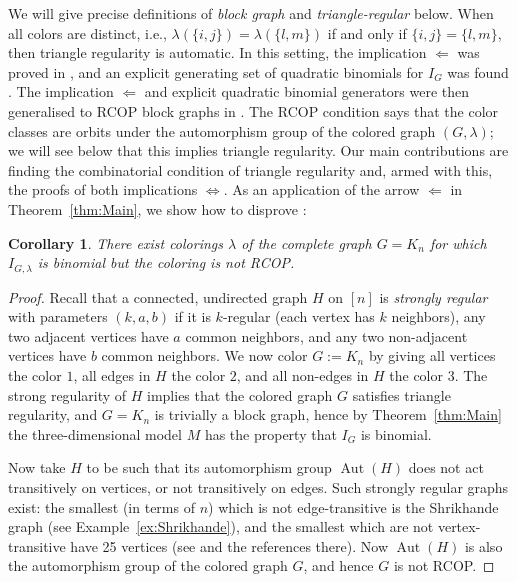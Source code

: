 \documentclass[a4paper, 11pt]{amsart}
\numberwithin{theorem}{section}
\newtheorem{corollary}[theorem]{Corollary}
\newcommand{\Aut}{\operatorname{Aut}}
\begin{document}
We will give precise definitions of {\em block graph} and {\em
triangle-regular} below. When all colors are distinct, i.e.,
$\lambda(\{i,j\})=\lambda(\{l,m\})$ if and only if $\{i,j\}=\{l,m\}$,
then triangle regularity is automatic. In this setting, the implication
$\Leftarrow$ was proved in \cite{MS21}, and an explicit generating
set of quadratic binomials for $I_G$ was found \cite[Theorem 5]{MS21}.
The implication $\Leftarrow$ and explicit quadratic binomial generators
were then generalised to RCOP block graphs in \cite{CMMPS23}. The RCOP
condition says that the color classes are orbits under the automorphism
group of the colored graph $(G,\lambda)$; we will see below that this
implies triangle regularity. Our main contributions are finding the
combinatorial condition of triangle regularity and, armed with this,
the proofs of both implications $\Leftrightarrow$. As an application of
the arrow $\Leftarrow$ in Theorem~\ref{thm:Main}, we show how to disprove \cite[Conjecture 7.8]{CMMPS23}:

\begin{corollary}
There exist colorings $\lambda$ of the complete graph $G=K_n$ for which
$I_{G,\lambda}$ is binomial but the coloring is not RCOP.
\end{corollary}

\begin{proof}
Recall that a connected, undirected graph $H$ on $[n]$ is {\em strongly
regular} with parameters $(k,a,b)$ if it is $k$-regular (each vertex has
$k$ neighbors), any two adjacent vertices have $a$ common neighbors, and
any two non-adjacent vertices have $b$ common neighbors.  We now
color $G:=K_n$ by giving all vertices the color $1$, all edges in $H$
the color $2$, and all non-edges in $H$ the color $3$. The strong
regularity of $H$ implies that the colored graph $G$ 
satisfies triangle regularity, and $G=K_n$ is trivially a block
graph, hence by Theorem~\ref{thm:Main} the three-dimensional model $M$
has the property that $I_G$ is binomial.

Now take $H$ to be such that its automorphism group $\Aut(H)$ does
not act transitively on vertices, or not transitively on edges. Such
strongly regular graphs exist: the smallest (in terms of $n$) which is not
edge-transitive is the Shrikhande graph (see
Example~\ref{ex:Shrikhande}), and the smallest which are not
vertex-transitive have 25 vertices (see \cite{SRG} and the references
there). Now $\Aut(H)$ is also the automorphism group of the colored
graph $G$, and hence $G$ is not RCOP.
\end{proof}
\end{document}

